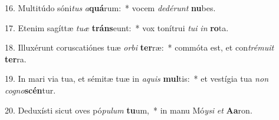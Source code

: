 16. Multitúdo sóni\textit{tus} \textit{a}\textbf{quá}rum:~*  vocem \textit{de}\textit{dé}\textit{runt} \textbf{nu}bes.\

17. Etenim sagíttæ \textit{tu}\textit{æ} \textbf{tráns}eunt:~*  vox tonítrui \textit{tu}\textit{i} \textit{in} \textbf{ro}ta.\

18. Illuxérunt coruscatiónes tuæ \textit{or}\textit{bi} \textbf{ter}ræ:~*  commóta est, et con\textit{tré}\textit{mu}\textit{it} \textbf{ter}ra.\

19. In mari via tua, et sémitæ tuæ in \textit{a}\textit{quis} \textbf{mul}tis:~*  et vestígia tua \textit{non} \textit{co}\textit{gno}\textbf{scén}tur.\

20. Deduxísti sicut oves pó\textit{pu}\textit{lum} \textbf{tu}um,~*  in manu Mó\textit{y}\textit{si} \textit{et} \textbf{A}\textbf{a}ron.\

